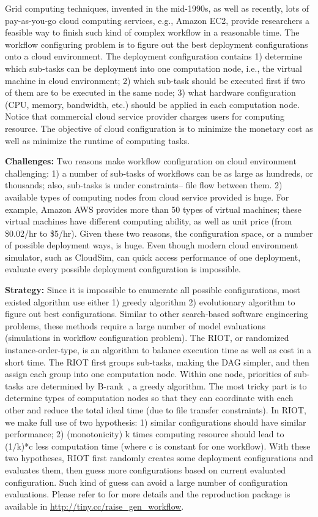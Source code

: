 \documentclass[table, xcdraw, sigconf,review, anonymous]{acmart}
\begin{document}
Grid computing techniques, invented in the mid-1990s, as well as recently, lots of pay-as-you-go cloud computing services, e.g., Amazon EC2, provide researchers a feasible way to finish such kind of complex workflow in a reasonable time.
The workflow configuring problem is to figure out the best deployment configurations onto a cloud environment. The deployment configuration
contains 1) determine which sub-tasks can be deployment into
one computation node, i.e., the virtual machine in cloud environment; 2) which sub-task should be executed first if two of them are to be executed in the same node; 3) what hardware configuration (CPU, memory, bandwidth, etc.) should be applied in each computation node. Notice that commercial cloud service provider charges users for computing resource. 
The objective of cloud configuration is to minimize the monetary cost as well as minimize the runtime of computing tasks.


\noindent\textbf{Challenges: } 
Two reasons make workflow configuration on cloud environment challenging: 1)  a number of sub-tasks of workflows can be as large as hundreds, or thousands; also, sub-tasks is under constraints-- file flow between them. 2) available types of
computing nodes from cloud service provided is huge.
For example, Amazon AWS provides more than 50 types of virtual machines; these
virtual machines have different computing ability, as well as unit price (from \$0.02/hr to \$5/hr).
Given these two reasons,
the configuration space, or a number of possible deployment ways, is huge.
Even though modern cloud environment simulator, such as CloudSim, can quick
access performance of one deployment, evaluate every
possible deployment configuration is impossible.

\noindent\textbf{Strategy:} 
Since it is impossible to enumerate all possible configurations, most existed algorithm use either 1) greedy algorithm 2) evolutionary algorithm to figure out best configurations.
Similar to other search-based software engineering problems,
these methods require a large number of model evaluations (simulations in workflow configuration problem).
The RIOT, or randomized instance-order-type, is an algorithm to balance execution time as well as cost
in a short time.
The RIOT first groups sub-tasks, making the DAG simpler, and then
assign each group into one computation node. Within one node,
priorities of sub-tasks are determined by
B-rank~\cite{topcuoglu2002performance}, a greedy algorithm. 
The most tricky part is to determine types of computation nodes so that they can coordinate with each other and reduce the total ideal time (due to file transfer constraints).
In RIOT,
we make full use of two hypothesis: 1) similar configurations should have similar performance; 2) (monotonicity) k times computing resource should lead to (1/k)*c less computation time (where c is constant for one workflow).
With these two hypotheses,
RIOT first randomly creates some deployment configurations and evaluates them, then guess more configurations based on current evaluated configuration. Such kind of guess can avoid a large number of configuration evaluations. Please refer to \cite{chen2017riot} for more details and the reproduction package is available in \url{http://tiny.cc/raise_gen_workflow}.
\end{document}
